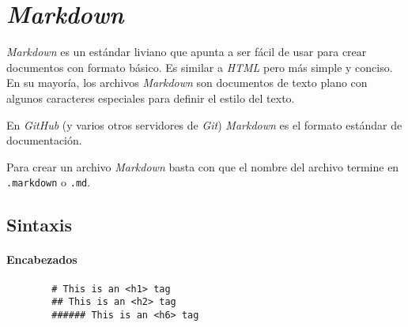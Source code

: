 \section{\textit{Markdown}}
  \textit{Markdown} es un estándar liviano que apunta a ser fácil de usar para crear documentos con
  formato básico.
  Es similar a \textit{HTML} pero más simple y conciso.
  En su mayoría, los archivos \textit{Markdown} son documentos de texto plano con algunos caracteres
  especiales para definir el estilo del texto.

  En \textit{GitHub} (y varios otros servidores de \textit{Git}) \textit{Markdown} es el formato 
  estándar de documentación.

  Para crear un archivo \textit{Markdown} basta con que el nombre del archivo termine en 
  \texttt{.markdown} o \texttt{.md}.

  \subsection{Sintaxis}
    \paragraph{Encabezados}
      \begin{verbatim}
        # This is an <h1> tag
        ## This is an <h2> tag
        ###### This is an <h6> tag
      \end{verbatim}